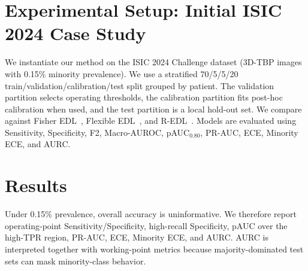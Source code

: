 \documentclass[letterpaper]{article} %
\begin{document}
\section{Experimental Setup: Initial ISIC 2024 Case Study}
We instantiate our method on the ISIC 2024 Challenge dataset (3D-TBP images with 0.15\% minority prevalence). We use a stratified 70/5/5/20 train/validation/calibration/test split grouped by patient. The validation partition selects operating thresholds, the calibration partition fits post-hoc calibration when used, and the test partition is a local hold-out set. We compare against Fisher EDL~\cite{deng2023fisher}, Flexible EDL~\cite{yoon2025flexible}, and R-EDL~\cite{chen2023redl}. Models are evaluated using Sensitivity, Specificity, F2, Macro-AUROC, pAUC$_{0.80}$, PR-AUC, ECE, Minority ECE, and AURC.

\section{Results}
Under 0.15\% prevalence, overall accuracy is uninformative. We therefore report operating-point Sensitivity/Specificity, high-recall Specificity, pAUC over the high-TPR region, PR-AUC, ECE, Minority ECE, and AURC. AURC is interpreted together with working-point metrics because majority-dominated test sets can mask minority-class behavior.
\end{document}
